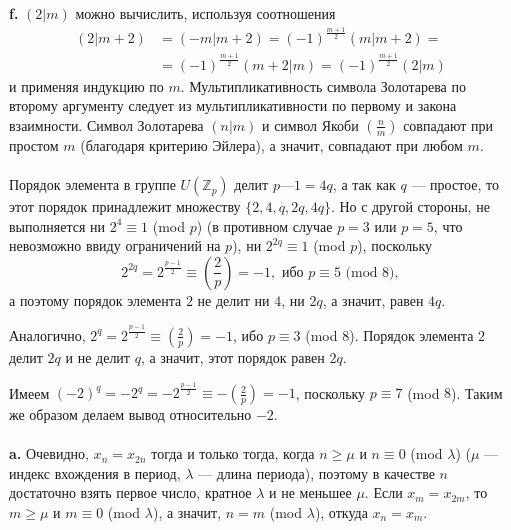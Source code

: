 \documentclass{mai_book}
\begin{document}
\textbf{f. } $(2|m)$ можно вычислить, используя соотношения
\begin{align*}
	(2|m+2) & = (-m|m+2) = (-1)^{\frac{m+1}{2}} (m|m+2) = \\
	& = (-1)^{\frac{m+1}{2}}(m+2|m) = (-1)^{\frac{m+1}{2}}(2|m)
\end{align*}
и применяя индукцию по $m$. Мультипликативность символа Золотарева по второму аргументу следует из мультипликативности по первому и закона взаимности. Символ Золотарева $(n|m)$ и символ Якоби $(\frac{n}{m})$ совпадают при простом $m$ (благодаря критерию Эйлера), а значит, совпадают при любом $m$. \\

 \\

Порядок элемента в группе $U(\mathbb{Z}_p)$ делит $p — 1 = 4q$, а так как $q$ --- простое, то этот порядок принадлежит множеству $\{2,4,q,2q,4q\}$. Но с другой стороны, не выполняется ни $2^4 \equiv 1$ (mod $p$) (в противном случае $p = 3$ или $p = 5$, что невозможно ввиду ограничений на $p$), ни $2^{2q} \equiv 1$ (mod $p$), поскольку
\begin{equation*}
	2^{2q} = 2^{\frac{p-1}{2}} \equiv \left( \frac{2}{p} \right) = -1, \text{ ибо } p \equiv 5 \text{ (mod } 8),
\end{equation*}
а поэтому порядок элемента $2$ не делит ни $4$, ни $2q$, а значит, равен $4q$. \par
Аналогично, $2^q = 2^{\frac{p-1}{2}} \equiv (\frac{2}{p}) = -1$, ибо $p \equiv 3$ (mod $8$). Порядок элемента $2$ делит $2q$ и не делит $q$, а значит, этот порядок равен $2q$. \par
Имеем $(-2)^q = -2^q = -2^{\frac{p-1}{2}} \equiv -(\frac{2}{p}) = -1$, поскольку $p \equiv 7$ (mod $8$). Таким же образом делаем вывод относительно $-2$. \\ 

 \\

\textbf{a. } Очевидно, $x_n = x_{2n}$ тогда и только тогда, когда $n \ge \mu$ и $n \equiv 0$ (mod $\lambda$) ($\mu$ — индекс вхождения в период, $\lambda$ — длина периода), поэтому в качестве $n$ достаточно взять первое число, кратное $\lambda$ и не меньшее $\mu$. Если $x_m = x_{2m}$, то $m \ge \mu$ и $m \equiv 0$ (mod $\lambda$), а значит,  $n = m$ (mod $\lambda$), откуда $x_n = x_m$. \smallskip
\end{document}
